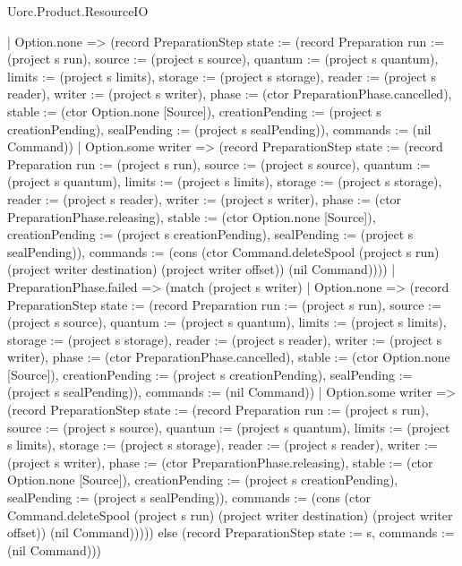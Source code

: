 \begin{lexlean}{Uorc.Product.ResourceIO}
\begin{semanticmodule}
{      | Option.none => (record PreparationStep {state := (record Preparation {run := (project s run), source := (project s source), quantum := (project s quantum), limits := (project s limits), storage := (project s storage), reader := (project s reader), writer := (project s writer), phase := (ctor PreparationPhase.cancelled), stable := (ctor Option.none [Source]), creationPending := (project s creationPending), sealPending := (project s sealPending)}), commands := (nil Command)})
      | Option.some writer => (record PreparationStep {state := (record Preparation {run := (project s run), source := (project s source), quantum := (project s quantum), limits := (project s limits), storage := (project s storage), reader := (project s reader), writer := (project s writer), phase := (ctor PreparationPhase.releasing), stable := (ctor Option.none [Source]), creationPending := (project s creationPending), sealPending := (project s sealPending)}), commands := (cons (ctor Command.deleteSpool (project s run) (project writer destination) (project writer offset)) (nil Command))}))
    | PreparationPhase.failed => (match (project s writer)
      | Option.none => (record PreparationStep {state := (record Preparation {run := (project s run), source := (project s source), quantum := (project s quantum), limits := (project s limits), storage := (project s storage), reader := (project s reader), writer := (project s writer), phase := (ctor PreparationPhase.cancelled), stable := (ctor Option.none [Source]), creationPending := (project s creationPending), sealPending := (project s sealPending)}), commands := (nil Command)})
      | Option.some writer => (record PreparationStep {state := (record Preparation {run := (project s run), source := (project s source), quantum := (project s quantum), limits := (project s limits), storage := (project s storage), reader := (project s reader), writer := (project s writer), phase := (ctor PreparationPhase.releasing), stable := (ctor Option.none [Source]), creationPending := (project s creationPending), sealPending := (project s sealPending)}), commands := (cons (ctor Command.deleteSpool (project s run) (project writer destination) (project writer offset)) (nil Command))}))) else (record PreparationStep {state := s, commands := (nil Command)}))
}


\end{semanticmodule}
\end{lexlean}
